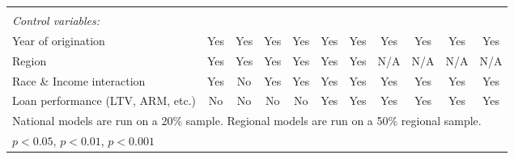 {\begin{tabular}{l*{10}{c}}
\hspace{5mm}        &                     &                     &                     &                     &                     &                     &                     &                     &                     &                     \\
\emph{Control variables:}&                     &                     &                     &                     &                     &                     &                     &                     &                     &                     \\
Year of origination &         Yes         &         Yes         &         Yes         &         Yes         &         Yes         &         Yes         &         Yes         &         Yes         &         Yes         &         Yes         \\
Region              &         Yes         &         Yes         &         Yes         &         Yes         &         Yes         &         Yes         &         N/A         &         N/A         &         N/A         &         N/A         \\
Race \& Income interaction&         Yes         &          No         &         Yes         &         Yes         &         Yes         &         Yes         &         Yes         &         Yes         &         Yes         &         Yes         \\
Loan performance (LTV, ARM, etc.)&          No         &          No         &          No         &          No         &         Yes         &         Yes         &         Yes         &         Yes         &         Yes         &         Yes         \\
\hline\hline
\multicolumn{11}{l}{\footnotesize National models are run on a 20\% sample.  Regional models are run on a 50\% regional sample.}\\
\multicolumn{11}{l}{\footnotesize \sym{*} \(p<0.05\), \sym{**} \(p<0.01\), \sym{***} \(p<0.001\)}\\
\end{tabular}
}
